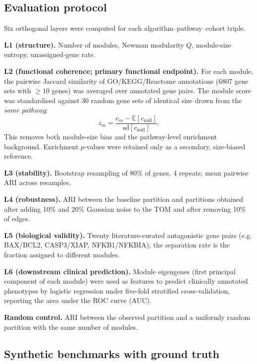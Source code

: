 \documentclass[twocolumn,11pt]{article}
\begin{document}
\subsection{Evaluation protocol}

Six orthogonal layers were computed for each algorithm--pathway--cohort triple.

\noindent\textbf{L1 (structure).} Number of modules, Newman modularity $Q$, module-size
entropy, unassigned-gene rate.

\noindent\textbf{L2 (functional coherence; primary functional endpoint).} For each module,
the pairwise Jaccard similarity of GO/KEGG/Reactome annotations (6807 gene sets with
$\geq 10$ genes) was averaged over annotated gene pairs. The module score was standardised
against 30 random gene sets of identical size drawn from the \emph{same pathway}:
\begin{equation}
z_m = \frac{c_m - \mathbb{E}[c_{\mathrm{null}}]}{\mathrm{sd}[c_{\mathrm{null}}]}.
\end{equation}
This removes both module-size bias and the pathway-level enrichment background. Enrichment
$p$-values were retained only as a secondary, size-biased reference.

\noindent\textbf{L3 (stability).} Bootstrap resampling of 80\% of genes, 4 repeats; mean
pairwise ARI across resamples.

\noindent\textbf{L4 (robustness).} ARI between the baseline partition and partitions
obtained after adding 10\% and 20\% Gaussian noise to the TOM and after removing 10\% of
edges.

\noindent\textbf{L5 (biological validity).} Twenty literature-curated antagonistic gene
pairs (e.g. BAX/BCL2, CASP3/XIAP, NFKB1/NFKBIA); the separation rate is the fraction
assigned to different modules.

\noindent\textbf{L6 (downstream clinical prediction).} Module eigengenes (first principal
component of each module) were used as features to predict clinically annotated phenotypes
by logistic regression under five-fold stratified cross-validation, reporting the area
under the ROC curve (AUC).

\noindent\textbf{Random control.} ARI between the observed partition and a uniformly random
partition with the same number of modules.

\subsection{Synthetic benchmarks with ground truth}
\end{document}
